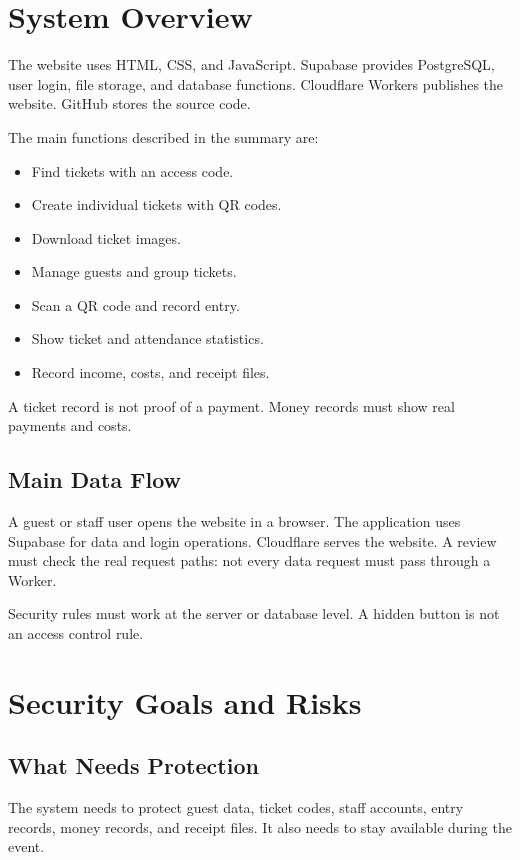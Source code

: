 \documentclass[conference]{IEEEtran}
\begin{document}
\section{System Overview}
The website uses HTML, CSS, and JavaScript. Supabase provides PostgreSQL, user login, file storage, and database functions. Cloudflare Workers publishes the website. GitHub stores the source code.

The main functions described in the summary are:
\begin{itemize}
\item Find tickets with an access code.
\item Create individual tickets with QR codes.
\item Download ticket images.
\item Manage guests and group tickets.
\item Scan a QR code and record entry.
\item Show ticket and attendance statistics.
\item Record income, costs, and receipt files.
\end{itemize}

A ticket record is not proof of a payment. Money records must show real payments and costs.

\subsection{Main Data Flow}
A guest or staff user opens the website in a browser. The application uses Supabase for data and login operations. Cloudflare serves the website. A review must check the real request paths: not every data request must pass through a Worker.

Security rules must work at the server or database level. A hidden button is not an access control rule.

\section{Security Goals and Risks}
\subsection{What Needs Protection}
The system needs to protect guest data, ticket codes, staff accounts, entry records, money records, and receipt files. It also needs to stay available during the event.
\end{document}
